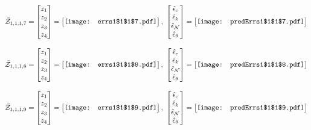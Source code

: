 \documentclass[12pt]{article}
\begin{document}
\begin{gather*}
\bar{\mathcal{Z}}_{1,1,1,7}=\begin{bmatrix}
z_1\\
z_2\\
z_3\\
z_4
 \end{bmatrix}= \begin{bmatrix}
\vcenter{\hbox{\texttt{[image: errs1\$1\$1\$7.pdf]}}}
 \end{bmatrix},\,\, \begin{bmatrix}
\hat{\epsilon}_c\\\hat{\epsilon}_k\\\hat{\epsilon}_\mathcal{N}\\\hat{\epsilon}_\theta
 \end{bmatrix}=\begin{bmatrix}
\vcenter{\hbox{\texttt{[image: predErrs1\$1\$1\$7.pdf]}}}
 \end{bmatrix}
\end{gather*}


\begin{gather*}
\bar{\mathcal{Z}}_{1,1,1,8}=\begin{bmatrix}
z_1\\
z_2\\
z_3\\
z_4
 \end{bmatrix}= \begin{bmatrix}
\vcenter{\hbox{\texttt{[image: errs1\$1\$1\$8.pdf]}}}
 \end{bmatrix},\,\, \begin{bmatrix}
\hat{\epsilon}_c\\\hat{\epsilon}_k\\\hat{\epsilon}_\mathcal{N}\\\hat{\epsilon}_\theta
 \end{bmatrix}=\begin{bmatrix}
\vcenter{\hbox{\texttt{[image: predErrs1\$1\$1\$8.pdf]}}}
 \end{bmatrix}
\end{gather*}



\begin{gather*}
\bar{\mathcal{Z}}_{1,1,1,9}=\begin{bmatrix}
z_1\\
z_2\\
z_3\\
z_4
 \end{bmatrix}= \begin{bmatrix}
\vcenter{\hbox{\texttt{[image: errs1\$1\$1\$9.pdf]}}}
 \end{bmatrix},\,\, \begin{bmatrix}
\hat{\epsilon}_c\\\hat{\epsilon}_k\\\hat{\epsilon}_\mathcal{N}\\\hat{\epsilon}_\theta
 \end{bmatrix}=\begin{bmatrix}
\vcenter{\hbox{\texttt{[image: predErrs1\$1\$1\$9.pdf]}}}
 \end{bmatrix}
\end{gather*}
\end{document}
